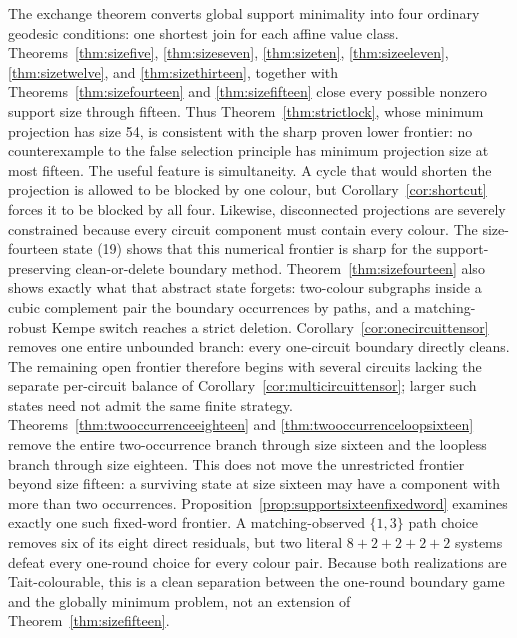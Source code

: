 \documentclass[11pt]{article}
\theoremstyle{definition}
\theoremstyle{remark}
\begin{document}
The exchange theorem converts global support minimality into four ordinary
geodesic conditions: one shortest join for each affine value class.
Theorems~\ref{thm:sizefive}, \ref{thm:sizeseven}, \ref{thm:sizeten},
\ref{thm:sizeeleven}, \ref{thm:sizetwelve}, and
\ref{thm:sizethirteen}, together with
Theorems~\ref{thm:sizefourteen} and \ref{thm:sizefifteen} close every
possible nonzero support size through fifteen.  Thus
Theorem~\ref{thm:strictlock}, whose minimum projection has size 54, is
consistent with the sharp proven lower frontier: no counterexample to
the false selection principle has minimum projection size at most
fifteen.
The useful feature is simultaneity.  A cycle that would shorten the
projection is allowed to be blocked by one colour, but
Corollary~\ref{cor:shortcut} forces it to be blocked by all four.
Likewise, disconnected projections are severely constrained because every
circuit component must contain every colour.
The size-fourteen state (19) shows that this numerical frontier is sharp
for the support-preserving clean-or-delete boundary method.
Theorem~\ref{thm:sizefourteen} also shows exactly what that abstract state
forgets: two-colour subgraphs inside a cubic complement pair the boundary
occurrences by paths, and a matching-robust Kempe switch reaches a strict
deletion.  Corollary~\ref{cor:onecircuittensor} removes one entire
unbounded branch: every one-circuit boundary directly cleans.  The
remaining open frontier therefore begins with several circuits lacking
the separate per-circuit balance of
Corollary~\ref{cor:multicircuittensor}; larger such states need not admit
the same finite strategy.  Theorems~\ref{thm:twooccurrenceeighteen} and
\ref{thm:twooccurrenceloopsixteen} remove the entire two-occurrence branch
through size sixteen and the loopless branch through size eighteen.  This
does not move the unrestricted frontier beyond size fifteen: a surviving
state at size sixteen may have a component with more than two occurrences.
Proposition~\ref{prop:supportsixteenfixedword} examines exactly one such
fixed-word frontier.  A matching-observed \(\{1,3\}\) path choice removes
six of its eight direct residuals, but two literal \(8+2+2+2+2\) systems
defeat every one-round choice for every colour pair.  Because both
realizations are Tait-colourable, this is a clean separation between the
one-round boundary game and the globally minimum problem, not an extension
of Theorem~\ref{thm:sizefifteen}.
\end{document}
